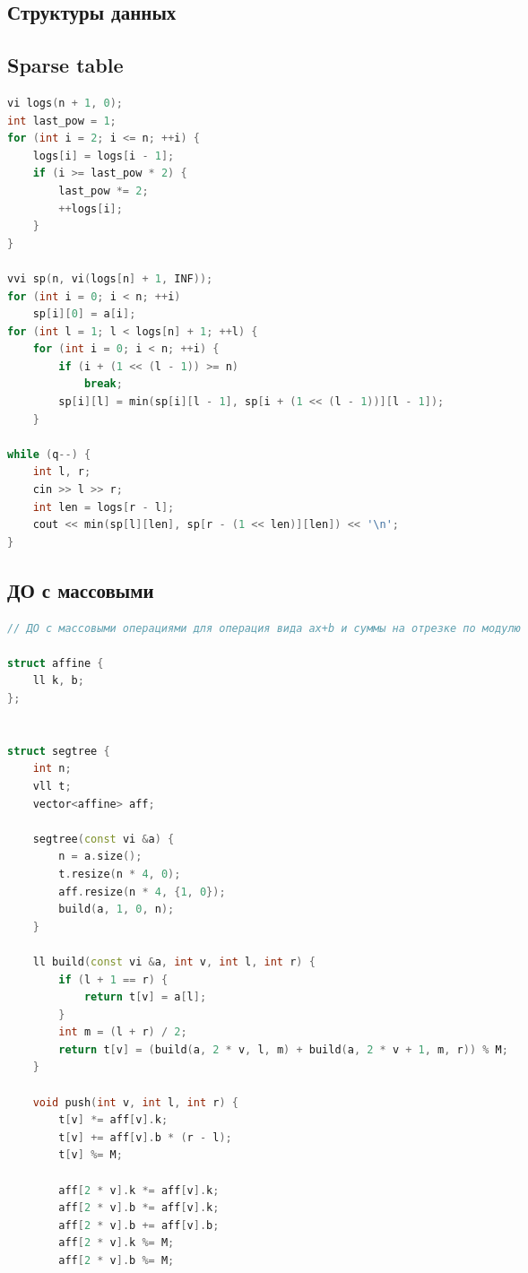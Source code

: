 \documentclass[10pt,a4paper,landscape,twosided]{extarticle}
\begin{document}
\begin{multicols}{3}
\section{Структуры данных}

\subsection{Sparse table}
\begin{lstlisting}[language=C++]
vi logs(n + 1, 0);
int last_pow = 1;
for (int i = 2; i <= n; ++i) {
    logs[i] = logs[i - 1];
    if (i >= last_pow * 2) {
        last_pow *= 2;
        ++logs[i];
    }
}

vvi sp(n, vi(logs[n] + 1, INF));
for (int i = 0; i < n; ++i)
    sp[i][0] = a[i];
for (int l = 1; l < logs[n] + 1; ++l) {
    for (int i = 0; i < n; ++i) {
        if (i + (1 << (l - 1)) >= n)
            break;
        sp[i][l] = min(sp[i][l - 1], sp[i + (1 << (l - 1))][l - 1]);
    }

while (q--) {
    int l, r;
    cin >> l >> r;
    int len = logs[r - l];
    cout << min(sp[l][len], sp[r - (1 << len)][len]) << '\n';
}
\end{lstlisting}

\subsection{ДО с массовыми}
\begin{lstlisting}[language=C++]
// ДО с массовыми операциями для операция вида ax+b и суммы на отрезке по модулю

struct affine {
    ll k, b;
};


struct segtree {
    int n;
    vll t;
    vector<affine> aff;

    segtree(const vi &a) {
        n = a.size();
        t.resize(n * 4, 0);
        aff.resize(n * 4, {1, 0});
        build(a, 1, 0, n);
    }

    ll build(const vi &a, int v, int l, int r) {
        if (l + 1 == r) {
            return t[v] = a[l];
        }
        int m = (l + r) / 2;
        return t[v] = (build(a, 2 * v, l, m) + build(a, 2 * v + 1, m, r)) % M;
    }

    void push(int v, int l, int r) {
        t[v] *= aff[v].k;
        t[v] += aff[v].b * (r - l);
        t[v] %= M;

        aff[2 * v].k *= aff[v].k;
        aff[2 * v].b *= aff[v].k;
        aff[2 * v].b += aff[v].b;
        aff[2 * v].k %= M;
        aff[2 * v].b %= M;


\end{lstlisting}
\end{multicols}
\end{document}
